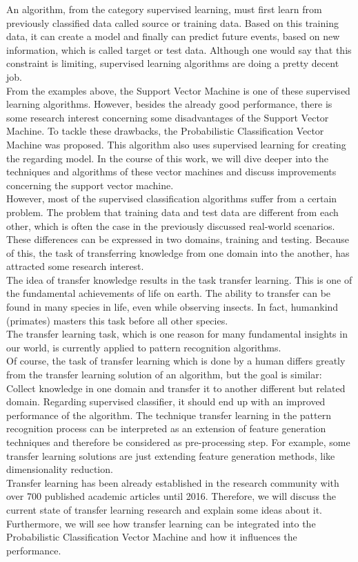 An algorithm, from the category supervised learning, must first learn from previously classified data called source or training data. Based on this training data, it can create a model and finally can predict future events, based on new information, which is called target or test data.
Although one would say that this constraint is limiting, supervised learning algorithms are doing a pretty decent job.\cite[p. 1]{Weiss.2016}\cite[p. 7]{Theodoridis.2008}\\
From the examples above, the Support Vector Machine is one of these supervised learning algorithms.
However, besides the already good performance, there is some research interest concerning some disadvantages of the Support Vector Machine.
To tackle these drawbacks, the Probabilistic Classification Vector Machine was proposed.
This algorithm also uses supervised learning for creating the regarding model.\cite{Chen.2009}
In the course of this work, we will dive deeper into the techniques and algorithms of these vector machines and discuss improvements concerning the support vector machine.\\
However, most of the supervised classification algorithms suffer from a certain problem. 
The problem that training data and test data are different from each other, which is often the case in the previously discussed real-world scenarios.
These differences can be expressed in two domains, training and testing.
Because of this, the task of transferring knowledge from one domain into the another, has attracted some research interest.\cite{Pan.2010}\\
The idea of transfer knowledge results in the task transfer learning. 
This is one of the fundamental achievements of life on earth.
The ability to transfer can be found in many species in life, even while observing insects.
In fact, humankind (primates) masters this task before all other species.\cite[p. 198-200]{Buchholtz.1982}\\
The transfer learning task, which is one reason for many fundamental insights in our world, is currently applied to pattern recognition algorithms.\\
Of course, the task of transfer learning which is done by a human differs greatly from the transfer learning solution of an algorithm, but the goal is similar:
Collect knowledge in one domain and transfer it to another different but related domain. Regarding supervised classifier, it should end up with an improved performance of the algorithm.\cite{Pan.2010}
The technique transfer learning in the pattern recognition process can be interpreted as an extension of feature generation techniques and therefore be considered as pre-processing step.
For example, some transfer learning solutions are just extending feature generation methods, like dimensionality reduction.\\
Transfer learning has been already established in the research community with over 700 published academic articles until 2016.\cite[p. 2]{Weiss.2016}
Therefore, we will discuss the current state of transfer learning research and explain some ideas about it.
Furthermore, we will see how transfer learning can be integrated into the Probabilistic Classification Vector Machine and how it influences the performance.
